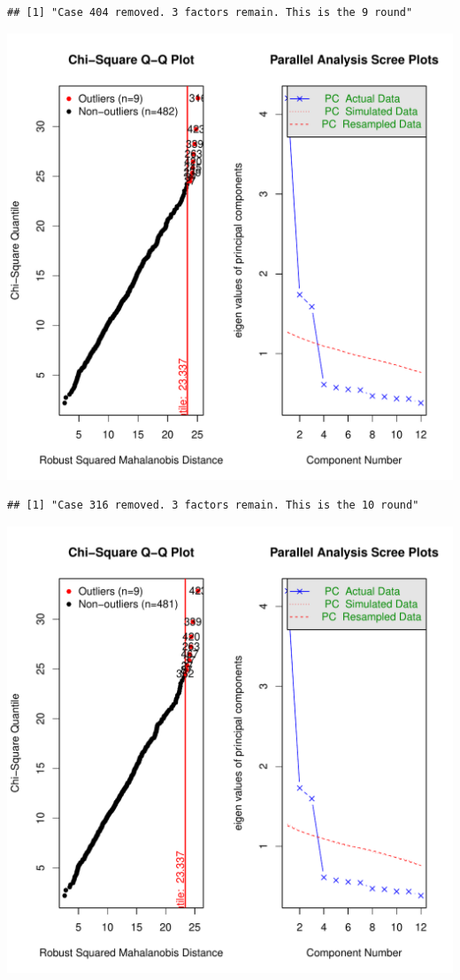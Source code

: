 \documentclass{article}\usepackage[]{graphicx}\usepackage[]{color}
\makeatletter
\def\maxwidth{ %
  \ifdim\Gin@nat@width>\linewidth
    \linewidth
  \else
    \Gin@nat@width
  \fi
}
\newenvironment{kframe}{%
 \def\at@end@of@kframe{}%
 \ifinner\ifhmode%
  \def\at@end@of@kframe{\end{minipage}}%
  \begin{minipage}{\columnwidth}%
 \fi\fi%
 \def\FrameCommand##1{\hskip\@totalleftmargin \hskip-\fboxsep
 \colorbox{shadecolor}{##1}\hskip-\fboxsep
     \hskip-\linewidth \hskip-\@totalleftmargin \hskip\columnwidth}%
 \MakeFramed {\advance\hsize-\width
   \@totalleftmargin\z@ \linewidth\hsize
   \@setminipage}}%
 {\par\unskip\endMakeFramed%
 \at@end@of@kframe}
\newenvironment{knitrout}{}{} %
\makeatother
\begin{document}
\begin{knitrout}
\begin{kframe}\begin{verbatim}
## [1] "Case 404 removed. 3 factors remain. This is the 9 round"
\end{verbatim}
\end{kframe}
\includegraphics[width=\maxwidth]{figure/unnamed-chunk-10-10} 
\begin{kframe}\begin{verbatim}
## [1] "Case 316 removed. 3 factors remain. This is the 10 round"
\end{verbatim}
\end{kframe}
\includegraphics[width=\maxwidth]{figure/unnamed-chunk-10-11} 

\end{knitrout}
\end{document}
